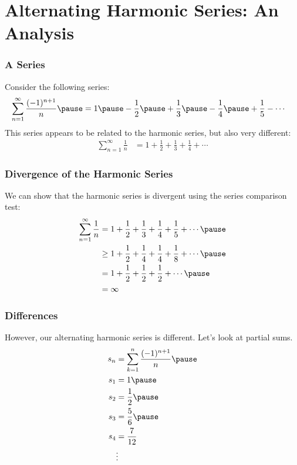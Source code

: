 \documentclass{beamer}
\begin{document}
\section{Alternating Harmonic Series: An Analysis}
\begin{frame}
  \frametitle{A Series}
  Consider the following series: \pause
  \begin{align*}
    \sum_{n=1}^{\infty} \frac{(-1)^{n + 1}}{n} \pause &= 1 \pause - \frac{1}{2} \pause + \frac{1}{3}\pause - \frac{1}{4} \pause + \frac{1}{5} - \cdots
  \end{align*} \pause
  This series appears to be related to the harmonic series, but also very different:
  \begin{align*}
    \sum_{n=1}^{\infty}\frac{1}{n} &= 1 + \frac{1}{2} + \frac{1}{3} + \frac{1}{4} + \cdots \tag*{Harmonic Series}
  \end{align*}
\end{frame}
\begin{frame}
  \frametitle{Divergence of the Harmonic Series}
  We can show that the harmonic series is divergent using the series comparison test:
  \begin{align*}
    \sum_{n=1}^{\infty}\frac{1}{n} &= 1 + \frac{1}{2} + \frac{1}{3} + \frac{1}{4} + \frac{1}{5} + \cdots\pause\\
                                   &\geq 1 + \frac{1}{2} + \frac{1}{4} + \frac{1}{4} + \frac{1}{8} + \cdots\pause\\
                                   &= 1 + \frac{1}{2} + \frac{1}{2} + \frac{1}{2} + \cdots\pause\\
                                   &= \infty
  \end{align*}
\end{frame}
\begin{frame}
  \frametitle{Differences}
  However, our alternating harmonic series is different. Let's look at partial sums. \pause
  \begin{align*}
    s_{n} &= \sum_{k=1}^{n} \frac{(-1)^{n+1}}{n}\pause\\
    s_{1} &= 1\pause\\
    s_{2} &= \frac{1}{2}\pause\\
    s_{3} &= \frac{5}{6}\pause\\
    s_{4} &= \frac{7}{12}\\
          &\vdots
  \end{align*}
\end{frame}
\end{document}
